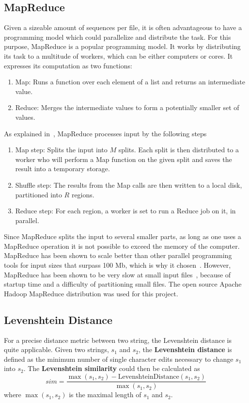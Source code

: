 \documentclass[../../main.tex]{subfiles}
\begin{document}
\subsection{MapReduce}\label{sec:mapreduce}
Given a sizeable amount of sequences per file, it is often advantageous to have a programming model which could parallelize and distribute the task. For this purpose, MapReduce is a popular programming model. It works by distributing its task to a multitude of workers, which can be either computers or cores. It expresses its computation as two functions:
\begin{enumerate}
\item Map: Runs a function over each element of a list and returns an intermediate value.
\item Reduce: Merges the intermediate values to form a potentially smaller set of values.
\end{enumerate}

As explained in~\cite{mapreduceExplained}, MapReduce processes input by the following steps
\begin{enumerate}
\item Map step: Splits the input into $M$ splits. Each split is then distributed to a worker who will perform a Map function on the given split and saves the result into a temporary storage.
\item Shuffle step: The results from the Map calls are then written to a local disk, partitioned into $R$ regions.
\item Reduce step: For each region, a worker is set to run a Reduce job on it, in parallel.
\end{enumerate}

Since MapReduce splits the input to several smaller parts, as long as one uses a MapReduce operation it is not possible to exceed the memory of the computer. MapReduce has been shown to scale better than other parallel programming tools for input sizes that surpass 100 Mb, which is why it chosen~\cite{compForkMapRed}. However, MapReduce has been shown to be very slow at small input files~\cite{compForkMapRed}, because of startup time and a difficulty of partitioning small files. The open source Apache Hadoop MapReduce distribution was used for this project. 

\subsection{Levenshtein Distance}\label{sec:levenshtein}
For a precise distance metric between two string, the Levenshtein distance is quite applicable. Given two strings, $s_1$ and $s_2$, the \textbf{Levenshtein distance} is defined as the minimum number of single character edits necessary to change $s_1$ into $s_2$. The \textbf{Levenshtein similarity} could then be calculated as
\begin{equation}\label{levenshteindistance}
sim=\frac{\max(s_1,s_2) - \mathrm{LevenshteinDistance}(s_1,s_2)}{\max(s_1,s_2)}
\end{equation}
where $\max(s_1,s_2)$ is the maximal length of $s_1$ and $s_2$.

 
\end{document}
